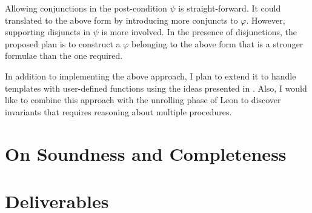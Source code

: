\documentclass[a4paper,10pt]{article}
\begin{document}
Allowing conjunctions in the post-condition $\psi$ is straight-forward. It could translated to the above form by introducing more conjuncts to $\varphi$. However, supporting disjuncts in $\psi$ is more involved.
In the presence of disjunctions, the proposed plan is to construct a $\varphi$ belonging to the above form that is a stronger formulae than the one required.

In addition to implementing the above approach, I plan to extend it to handle templates with user-defined functions using the ideas presented in \cite{dirk:VMCAI07}. Also, I would like to combine this approach with the unrolling phase of Leon to discover invariants that requires reasoning about multiple procedures.
 
\section{On Soundness and Completeness}



\section{Deliverables}
\end{document}
